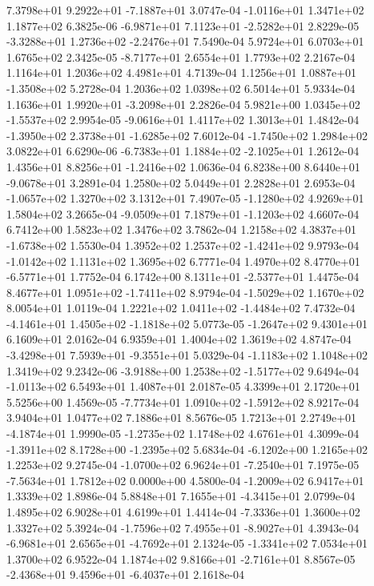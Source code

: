  7.3798e+01  9.2922e+01 -7.1887e+01  3.0747e-04
-1.0116e+01  1.3471e+02  1.1877e+02  6.3825e-06
-6.9871e+01  7.1123e+01 -2.5282e+01  2.8229e-05
-3.3288e+01  1.2736e+02 -2.2476e+01  7.5490e-04
5.9724e+01 6.0703e+01 1.6765e+02  2.3425e-05
-8.7177e+01  2.6554e+01  1.7793e+02  2.2167e-04
1.1164e+01 1.2036e+02 4.4981e+01  4.7139e-04
 1.1256e+01  1.0887e+01 -1.3508e+02  5.2728e-04
1.2036e+02 1.0398e+02 6.5014e+01  5.9334e-04
 1.1636e+01  1.9920e+01 -3.2098e+01  2.2826e-04
 5.9821e+00  1.0345e+02 -1.5537e+02  2.9954e-05
-9.0616e+01  1.4117e+02  1.3013e+01  1.4842e-04
-1.3950e+02  2.3738e+01 -1.6285e+02  7.6012e-04
-1.7450e+02  1.2984e+02  3.0822e+01  6.6290e-06
-6.7383e+01  1.1884e+02 -2.1025e+01  1.2612e-04
 1.4356e+01  8.8256e+01 -1.2416e+02  1.0636e-04
 6.8238e+00  8.6440e+01 -9.0678e+01  3.2891e-04
1.2580e+02 5.0449e+01 2.2828e+01  2.6953e-04
-1.0657e+02  1.3270e+02  3.1312e+01  7.4907e-05
-1.1280e+02  4.9269e+01  1.5804e+02  3.2665e-04
-9.0509e+01  7.1879e+01 -1.1203e+02  4.6607e-04
6.7412e+00 1.5823e+02 1.3476e+02  3.7862e-04
 1.2158e+02  4.3837e+01 -1.6738e+02  1.5530e-04
 1.3952e+02  1.2537e+02 -1.4241e+02  9.9793e-04
-1.0142e+02  1.1131e+02  1.3695e+02  6.7771e-04
 1.4970e+02  8.4770e+01 -6.5771e+01  1.7752e-04
 6.1742e+00  8.1311e+01 -2.5377e+01  1.4475e-04
 8.4677e+01  1.0951e+02 -1.7411e+02  8.9794e-04
-1.5029e+02  1.1670e+02  8.0054e+01  1.0119e-04
 1.2221e+02  1.0411e+02 -1.4484e+02  7.4732e-04
-4.1461e+01  1.4505e+02 -1.1818e+02  5.0773e-05
-1.2647e+02  9.4301e+01  6.1609e+01  2.0162e-04
6.9359e+01 1.4004e+02 1.3619e+02  4.8747e-04
-3.4298e+01  7.5939e+01 -9.3551e+01  5.0329e-04
-1.1183e+02  1.1048e+02  1.3419e+02  9.2342e-06
-3.9188e+00  1.2538e+02 -1.5177e+02  9.6494e-04
-1.0113e+02  6.5493e+01  1.4087e+01  2.0187e-05
4.3399e+01 2.1720e+01 5.5256e+00  1.4569e-05
-7.7734e+01  1.0910e+02 -1.5912e+02  8.9217e-04
3.9404e+01 1.0477e+02 7.1886e+01  8.5676e-05
 1.7213e+01  2.2749e+01 -4.1874e+01  1.9990e-05
-1.2735e+02  1.1748e+02  4.6761e+01  4.3099e-04
-1.3911e+02  8.1728e+00 -1.2395e+02  5.6834e-04
-6.1202e+00  1.2165e+02  1.2253e+02  9.2745e-04
-1.0700e+02  6.9624e+01 -7.2540e+01  7.1975e-05
-7.5634e+01  1.7812e+02  0.0000e+00  4.5800e-04
-1.2009e+02  6.9417e+01  1.3339e+02  1.8986e-04
 5.8848e+01  7.1655e+01 -4.3415e+01  2.0799e-04
1.4895e+02 6.9028e+01 4.6199e+01  1.4414e-04
-7.3336e+01  1.3600e+02  1.3327e+02  5.3924e-04
-1.7596e+02  7.4955e+01 -8.9027e+01  4.3943e-04
-6.9681e+01  2.6565e+01 -4.7692e+01  2.1324e-05
-1.3341e+02  7.0534e+01  1.3700e+02  6.9522e-04
 1.1874e+02  9.8166e+01 -2.7161e+01  8.8567e-05
-2.4368e+01  9.4596e+01 -6.4037e+01  2.1618e-04
